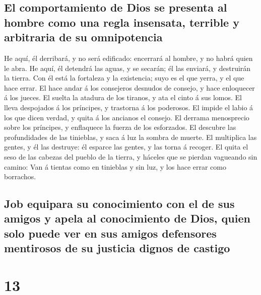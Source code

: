 \hypertarget{el-comportamiento-de-dios-se-presenta-al-hombre-como-una-regla-insensata-terrible-y-arbitraria-de-su-omnipotencia}{%
\subsection{El comportamiento de Dios se presenta al hombre como una
regla insensata, terrible y arbitraria de su
omnipotencia}\label{el-comportamiento-de-dios-se-presenta-al-hombre-como-una-regla-insensata-terrible-y-arbitraria-de-su-omnipotencia}}

 He aquí, él derribará, y no será edificado: encerrará al
hombre, y no habrá quien le abra.  He aquí, él detendrá
las aguas, y se secarán; él las enviará, y destruirán la tierra.
 Con él está la fortaleza y la existencia; suyo es el que
yerra, y el que hace errar.  El hace andar á los
consejeros desnudos de consejo, y hace enloquecer á los jueces.
 El suelta la atadura de los tiranos, y ata el cinto á
sus lomos.  El lleva despojados á los príncipes, y
trastorna á los poderosos.  El impide el labio á los que
dicen verdad, y quita á los ancianos el consejo.  El
derrama menosprecio sobre los príncipes, y enflaquece la fuerza de los
esforzados.  El descubre las profundidades de las
tinieblas, y saca á luz la sombra de muerte.  El
multiplica las gentes, y él las destruye: él esparce las gentes, y las
torna á recoger.  El quita el seso de las cabezas del
pueblo de la tierra, y háceles que se pierdan vagueando sin camino:
 Van á tientas como en tinieblas y sin luz, y los hace
errar como borrachos.

\hypertarget{job-equipara-su-conocimiento-con-el-de-sus-amigos-y-apela-al-conocimiento-de-dios-quien-solo-puede-ver-en-sus-amigos-defensores-mentirosos-de-su-justicia-dignos-de-castigo}{%
\subsection{Job equipara su conocimiento con el de sus amigos y apela al
conocimiento de Dios, quien solo puede ver en sus amigos defensores
mentirosos de su justicia dignos de
castigo}\label{job-equipara-su-conocimiento-con-el-de-sus-amigos-y-apela-al-conocimiento-de-dios-quien-solo-puede-ver-en-sus-amigos-defensores-mentirosos-de-su-justicia-dignos-de-castigo}}

\hypertarget{section-18-13}{%
\section{13}\label{section-18-13}}

